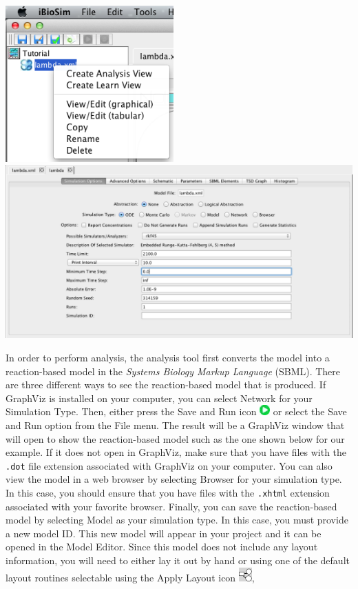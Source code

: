 \documentclass[titlepage,11pt]{article}
\begin{document}
\begin{center}
\includegraphics[height=60mm]{screenshots/GCMAnalysis}\\
\includegraphics[width=160mm]{screenshots/analysisView}
\end{center}

In order to perform analysis, the analysis tool first converts the model into a reaction-based model in the \emph{Systems Biology Markup Language} (SBML).  There are three different ways to see the reaction-based model that is produced.  If GraphViz is installed on your computer, you can select Network for your Simulation Type.  Then, either press the Save and Run icon \includegraphics{../gui/icons/run-icon} or select the Save and Run option from the File menu.  The result will be a GraphViz window that will open to show the reaction-based model such as the one shown below for our example.  If it does not open in GraphViz, make sure that you have files with the {\tt .dot} file extension associated with GraphViz on your computer.  You can also view the model in a web browser by selecting Browser for your simulation type.  In this case, you should ensure that you have files with the {\tt .xhtml} extension associated with your favorite browser.  Finally, you can save the reaction-based model by selecting Model as your simulation type.  In this case, you must provide a new model ID.  This new model will appear in your project and it can be opened in the Model Editor.  Since this model does not include any layout information, you will need to either lay it out by hand or using one of the default layout routines selectable using the Apply Layout icon    \includegraphics{../gui/icons/modelview/choose_layout_selected},
\end{document}
